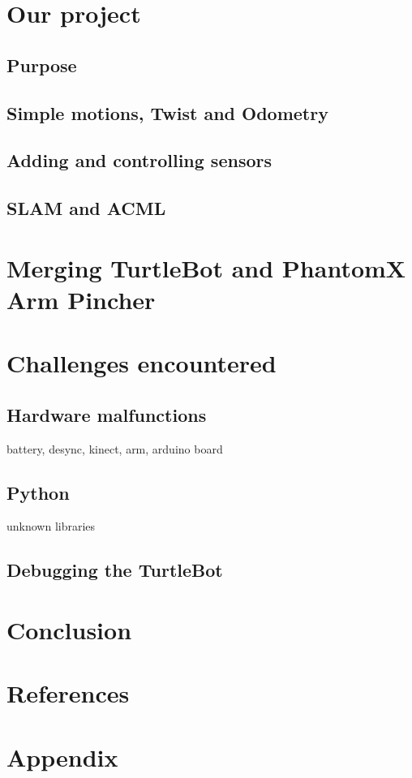 \documentclass[aps,letterpaper,11pt]{revtex4}
\begin{document}
\section{Our project}
\subsection{Purpose}

\subsection{Simple motions, Twist and Odometry}
\subsection{Adding and controlling sensors}
\subsection{SLAM and ACML}
\section{Merging TurtleBot and PhantomX Arm Pincher}

\section{Challenges encountered}
\subsection{Hardware malfunctions}
	battery, desync, kinect, arm, arduino board
\subsection{Python}
	unknown libraries
\subsection{Debugging the TurtleBot}

\section{Conclusion}

\section{References}

\section{Appendix}
\end{document}
